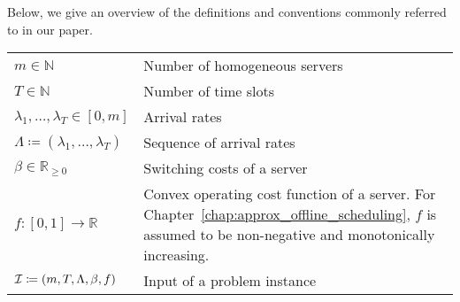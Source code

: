 
Below, we give an overview of the definitions and conventions commonly referred to in our paper.

\begin{table}[H]
\begin{tabularx}{\textwidth}{ | >{\centering\arraybackslash}X | >{\arraybackslash}m{} | }
  \hline \multicolumn{2}{|c|}{\textbf{\large Input}} \\  
  \hline $m\in\mathbb{N}$ & Number of homogeneous servers \\
  \hline $T\in\mathbb{N}$& Number of time slots\\
  \hline $\lambda_1,\dotsc,\lambda_{T}\in[0,m]$& Arrival rates\\
  \hline $\Lambda\coloneqq(\lambda_1,\dotsc,\lambda_T)$& Sequence of arrival rates\\
  \hline $\beta\in\mathbb{R}_{\ge 0}$& Switching costs of a server\\
  \hline $f:[0,1]\rightarrow\mathbb{R}$& Convex operating cost function of a server. For Chapter~\ref{chap:approx_offline_scheduling}, $f$ is assumed to be non-negative and monotonically increasing.\\
  \hline $\mathcal{I}\coloneqq(m,T,\Lambda,\beta,f)$& Input of a problem instance\\
  \hline
\end{tabularx}
\end{table}


